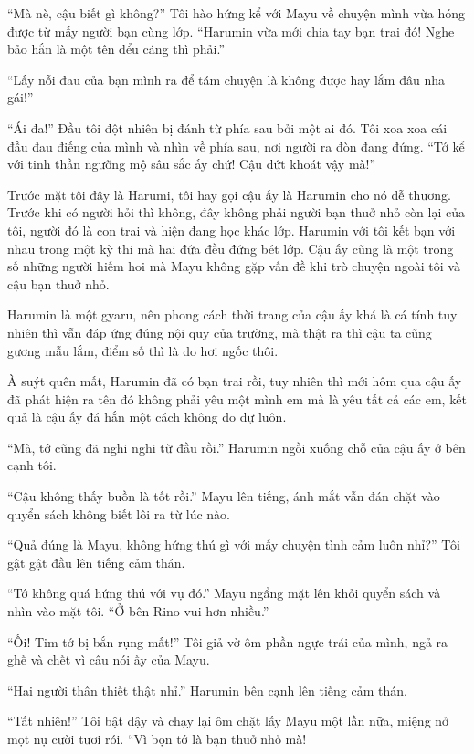 {    ``Mà nè, cậu biết gì không?'' Tôi hào hứng kể với Mayu về chuyện mình
    vừa hóng được từ mấy người bạn cùng lớp. ``Harumin vừa mới chia tay bạn
    trai đó! Nghe bảo hắn là một tên đểu cáng thì phải.''

    ``Lấy nỗi đau của bạn mình ra để tám chuyện là không được hay lắm đâu
    nha gái!''

    ``Ái đa!'' Đầu tôi đột nhiên bị đánh từ phía sau bởi một ai đó. Tôi xoa
    xoa cái đầu đau điếng của mình và nhìn về phía sau, nơi người ra đòn
    đang đứng. ``Tớ kể với tinh thần ngưỡng mộ sâu sắc ấy chứ! Cậu dứt khoát
    vậy mà!''

    Trước mặt tôi đây là Harumi, tôi hay gọi cậu ấy là Harumin cho nó dễ
    thương. Trước khi có người hỏi thì không, đây không phải người bạn thuở
    nhỏ còn lại của tôi, người đó là con trai và hiện đang học khác lớp.
    Harumin với tôi kết bạn với nhau trong một kỳ thi mà hai đứa đều đứng
    bét lớp. Cậu ấy cũng là một trong số những người hiếm hoi mà Mayu không
    gặp vấn đề khi trò chuyện ngoài tôi và cậu bạn thuở nhỏ.

    Harumin là một gyaru, nên phong cách thời trang của cậu ấy khá là cá
    tính tuy nhiên thì vẫn đáp ứng đúng nội quy của trường, mà thật ra thì
    cậu ta cũng gương mẫu lắm, điểm số thì là do hơi ngốc thôi.

    À suýt quên mất, Harumin đã có bạn trai rồi, tuy nhiên thì mới hôm qua
    cậu ấy đã phát hiện ra tên đó không phải yêu một mình em mà là yêu tất
    cả các em, kết quả là cậu ấy đá hắn một cách không do dự luôn.

    ``Mà, tớ cũng đã nghi nghi từ đầu rồi.'' Harumin ngồi xuống chỗ của cậu
    ấy ở bên cạnh tôi.

    ``Cậu không thấy buồn là tốt rồi.'' Mayu lên tiếng, ánh mắt vẫn đán chặt
    vào quyển sách không biết lôi ra từ lúc nào.

    ``Quả đúng là Mayu, không hứng thú gì với mấy chuyện tình cảm luôn
    nhỉ?'' Tôi gật gật đầu lên tiếng cảm thán.

    ``Tớ không quá hứng thú với vụ đó.'' Mayu ngẩng mặt lên khỏi quyển sách
    và nhìn vào mặt tôi. ``Ở bên Rino vui hơn nhiều.''

    ``Ối! Tim tớ bị bắn rụng mất!'' Tôi giả vờ ôm phần ngực trái của mình,
    ngả ra ghế và chết vì câu nói ấy của Mayu.

    ``Hai người thân thiết thật nhỉ.'' Harumin bên cạnh lên tiếng cảm thán.

    ``Tất nhiên!'' Tôi bật dậy và chạy lại ôm chặt lấy Mayu một lần nữa,
    miệng nở mọt nụ cười tươi rói. ``Vì bọn tớ là bạn thuở nhỏ mà!

}
